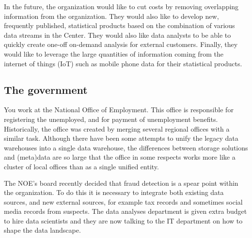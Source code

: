 \begin{subappendices}
In the future, the organization would like to cut costs by removing overlapping
information from the organization. They would also like to develop new,
frequently published, statistical products based on the combination of various
data streams in the Center. They would also like data analysts to be able to
quickly create one-off on-demand analysis for external customers. Finally, they
would like to leverage the large quantities of information coming from the
internet of things (IoT) such as mobile phone data for their statistical
products.


\subsection{The government}

You work at the National Office of Employment. This office is responsible for
registering the unemployed, and for payment of unemployment benefits.
Historically, the office was created by merging several regional offices with a
similar task. Although there have been some attempts to unify the legacy data
warehouses into a single data warehouse, the differences between storage
solutions and (meta)data are so large that the office in some respects works
more like a cluster of local offices than as a single unified entity.

The NOE's board recently decided that fraud detection is a spear point within
the organization. To do this it is necessary to integrate both existing data
sources, and new external sources, for example tax records and sometimes social
media records from suspects. The data analyses department is given extra budget
to hire data scientists and they are now talking to the IT department on how to
shape the data landscape.



\end{subappendices}






